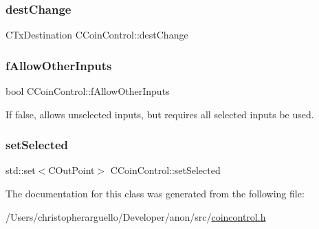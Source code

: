\subsubsection{\texorpdfstring{dest\+Change}{destChange}}
{\footnotesize\ttfamily C\+Tx\+Destination C\+Coin\+Control\+::dest\+Change}

\mbox{\label{class_c_coin_control_acd3e8686c8d78535153ed9fd734ef029}} 
\subsubsection{\texorpdfstring{f\+Allow\+Other\+Inputs}{fAllowOtherInputs}}
{\footnotesize\ttfamily bool C\+Coin\+Control\+::f\+Allow\+Other\+Inputs}



If false, allows unselected inputs, but requires all selected inputs be used. 

\mbox{\label{class_c_coin_control_ad8f80901aa608a4073cb9138f07d3e4e}} 
\subsubsection{\texorpdfstring{set\+Selected}{setSelected}}
{\footnotesize\ttfamily std\+::set$<$C\+Out\+Point$>$ C\+Coin\+Control\+::set\+Selected\hspace{0.3cm}{\ttfamily [private]}}



The documentation for this class was generated from the following file\+:\begin{DoxyCompactItemize}
\item 
/\+Users/christopherarguello/\+Developer/anon/src/\mbox{\hyperlink{coincontrol_8h}{coincontrol.\+h}}\end{DoxyCompactItemize}
